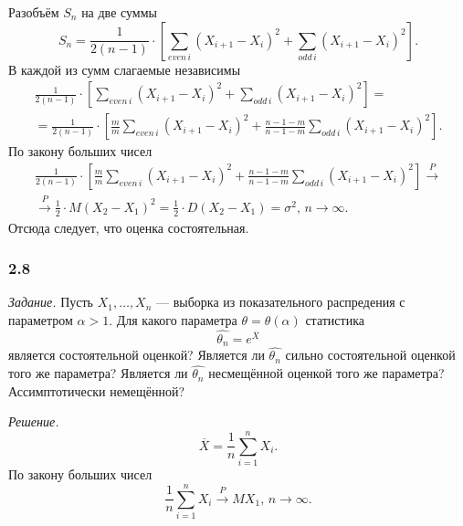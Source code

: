 Разобъём $S_n$ на две суммы
$$S_n =
  \frac{1}{2 \left( n - 1 \right) } \cdot
  \left[
    \sum \limits_{even \, i} \left( X_{i + 1} - X_i \right)^2 +
    \sum \limits_{odd \, i} \left( X_{i + 1} - X_i \right)^2
  \right].$$
В каждой из сумм слагаемые независимы
\begin{equation*}
  \begin{split}
    \frac{1}{2 \left( n - 1 \right) } \cdot
    \left[
      \sum \limits_{even \, i} \left( X_{i + 1} - X_i \right)^2 +
      \sum \limits_{odd \, i} \left( X_{i + 1} - X_i \right)^2
    \right] = \\
    = \frac{1}{2 \left( n - 1 \right) } \cdot
    \left[
      \frac{m}{m} \sum \limits_{even \, i} \left( X_{i + 1} - X_i \right)^2 +
      \frac{n - 1 - m}{n - 1 - m} \sum \limits_{odd \, i} \left( X_{i + 1} - X_i \right)^2
    \right].
  \end{split}
\end{equation*}
По закону больших чисел
\begin{equation*}
  \begin{split}
    \frac{1}{2 \left( n - 1 \right) } \cdot
    \left[
      \frac{m}{m} \sum \limits_{even \, i} \left( X_{i + 1} - X_i \right)^2 +
      \frac{n - 1 - m}{n - 1 - m} \sum \limits_{odd \, i} \left( X_{i + 1} - X_i \right)^2
    \right] \overset{P}{ \rightarrow } \\
    \overset{P}{ \rightarrow } \frac{1}{2} \cdot M \left( X_2 - X_1 \right)^2 =
    \frac{1}{2} \cdot D \left( X_2 - X_1 \right) =
    \sigma^2, \,
    n \to \infty.
  \end{split}
\end{equation*}
Отсюда следует, что оценка состоятельная.

\subsubsection*{2.8}

\textit{Задание.}
Пусть $X_1, \dotsc, X_n$ --- выборка из показательного распредения с параметром $ \alpha > 1$.
Для какого параметра $ \theta = \theta \left( \alpha \right) $ статистика
$$ \hat{ \theta_n} =
  e^{ \overline{X}}$$
является состоятельной оценкой?
Является ли $ \hat{ \theta_n}$ сильно состоятельной оценкой того же параметра?
Является ли $ \hat{ \theta_n}$ несмещённой оценкой того же параметра?
Ассимптотически немещённой?

\textit{Решение.}
$$ \overline{X} =
  \frac{1}{n} \sum \limits_{i = 1}^n X_i.$$
По закону больших чисел
$$ \frac{1}{n} \sum \limits_{i = 1}^n X_i \overset{P}{ \to } MX_1, \,
  n \to \infty.$$

